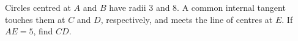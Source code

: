Circles centred at $ A $ and $ B $ have radii 3 and 8. A common internal tangent touches them at $ C $ and $ D $, respectively, and meets the line of centres at $ E $. If $ AE=5 $, find $ CD $.
